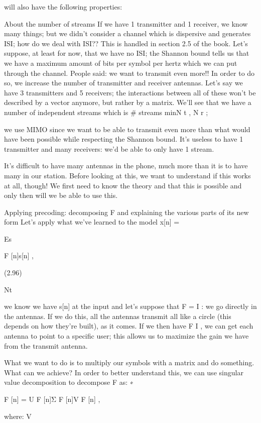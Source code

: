 {will also have the following properties:

About the number of streams If we have 1 transmitter and 1 receiver, we know many things; but we didn't consider a channel which is dispersive and generates ISI; how do we deal with ISI?? This is handled in section 2.5 of the book.
Let's suppose, at least for now, that we have no ISI; the Shannon bound tells us that we have a maximum amount of bits per symbol per hertz which we can put through the channel.
People said: we want to transmit even more!! In order to do so, we increase the number of transmitter and receiver antennas.
Let's say we have 3 transmitters and 5 receivers; the interactions between all of these won't be described by a vector anymore, but rather by a matrix.
We'll see that we have a number of independent streams which is
# streams \leq min{N t , N r } ;

we use MIMO since we want to be able to transmit even more than what would have been possible while respecting the Shannon bound.
It's useless to have 1 transmitter and many receivers: we'd be able to only have 1 stream.

It's difficult to have many antennas in the phone, much more than it is to have many in our station.
Before looking at this, we want to understand if this works at all, though! We first need to know the theory and that this is possible and only then will we be able to use this.

Applying precoding: decomposing F and explaining the various parts of its new form Let's apply what we've learned to the model x[n] = \sqrt

Es

F [n]s[n] ,

(2.96)

Nt

we know we have s[n] at the input and let's suppose that F = I : we go directly in the antennas. If we do this, all the antennas transmit all like a circle (this depends on how they're built), as it comes.
If we then have F \neq I , we can get each antenna to point to a specific user; this allows us to maximize the gain we have from the transmit antenna.

What we want to do is to multiply our symbols with a matrix and do something. What can we achieve?
In order to better understand this, we can use singular value decomposition to decompose F as:
∗

F [n] = U F [n]Σ F [n]V F [n] ,

where:
V

}
